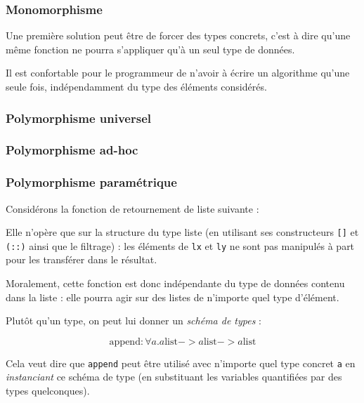 \subsubsection{Monomorphisme}

Une première solution peut être de forcer des types concrets, c'est à dire
qu'une même fonction ne pourra s'appliquer qu'à un seul type de données.

Il est confortable pour le programmeur de n'avoir à écrire un algorithme qu'une
seule fois, indépendamment du type des éléments considérés.

\subsubsection{Polymorphisme universel}


\subsubsection{Polymorphisme ad-hoc}


\subsubsection{Polymorphisme paramétrique}

Considérons la fonction de retournement de liste suivante :


Elle n'opère que sur la structure du type liste (en utilisant ses constructeurs
\texttt{{[}{]}} et \texttt{(::)} ainsi que le filtrage) : les éléments de
\texttt{lx} et \texttt{ly} ne sont pas manipulés à part pour les transférer dans
le résultat.

Moralement, cette fonction est donc indépendante du type de données contenu dans
la liste : elle pourra agir sur des listes de n'importe quel type d'élément.

Plutôt qu'un type, on peut lui donner un \emph{schéma de types} :

\[
  \textrm{append} : \forall a . a \textrm{list}
                             -> a \textrm{list}
                             -> a \textrm{list}
\]

Cela veut dire que \texttt{append} peut être utilisé avec n'importe quel type
concret \texttt{a} en \emph{instanciant} ce schéma de type (en substituant les
variables quantifiées par des types quelconques).

